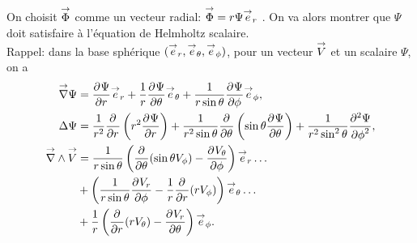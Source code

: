 On choisit \(\vect \Phi\) comme un vecteur radial: \(\vect \Phi = r \Psi \vect e_r\) \cite[p.~84]{bohren_absorption_2004}. On va alors montrer que \(\Psi\) doit satisfaire à l'équation de Helmholtz scalaire.\\

Rappel: dans la base sphérique \((\vect e_r, \vect e_\theta, \vect e_\phi)\), pour
un vecteur \(\vect V\)
et un scalaire \(\Psi\), on a
\begin{align*}
\vgrad \Psi &= \ddr{r}{\Psi} \vect e_r + \frac{1}{r}\ddr{\theta}{\Psi}\vect e_\theta + \frac{1}{r\sin\theta}\ddr{\phi}{\Psi} \vect e_\phi,
\\
 \Delta \Psi & = \frac{1}{r^2}\ddr{r}{}\left(r^2\ddr{r}{\Psi}\right)
+ \frac{1}{r^2\sin\theta}\ddr{\theta}{}\left(\sin\theta\ddr{\theta}{\Psi}\right)
+ \frac{1}{r^2\sin^2\theta}\ddr[2]{\phi}{\Psi},
\\
\vrot \vect V &= \frac{1}{r\sin\theta}\left(\ddr{\theta}{}(\sin\theta V_\phi)-\ddr{\phi}{V_\theta}\right)\vect e_r \dots\\
&+ \left(\frac{1}{r\sin\theta}\ddr{\phi}{V_r} - \frac{1}{r}\ddr{r}{}(rV_\phi)\right) \vect e_\theta \dots \\
&+ \frac{1}{r}\left( \ddr{r}{}(rV_\theta) - \ddr{\theta}{V_r}\right)\vect e_\phi.
\end{align*}


